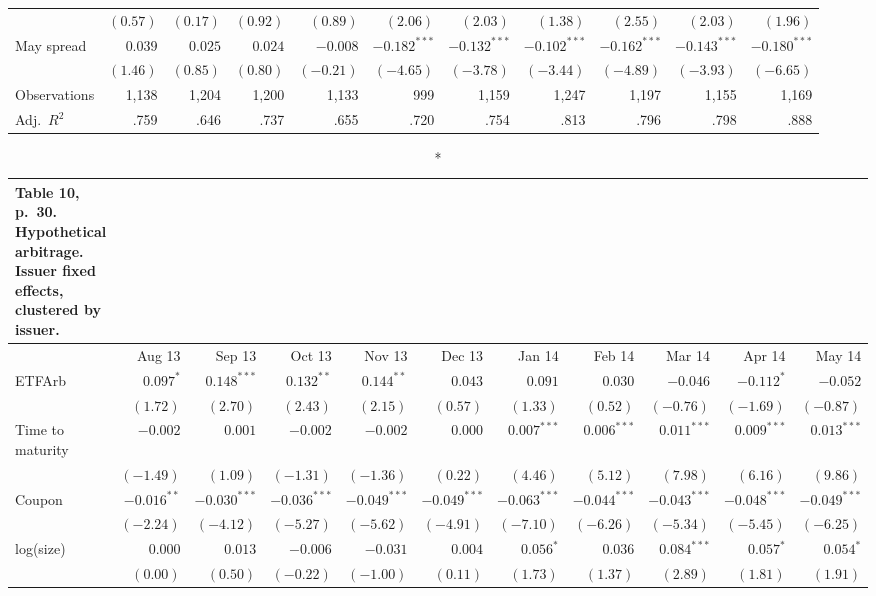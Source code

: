 \documentclass[10pt,a4paper]{article}
\begin{document}
{\begin{longtable}{@{}l*{10}{r}@{}}
 & $(0.57)$ & $(0.17)$ & $(0.92)$ & $(0.89)$ & $(2.06)$ & $(2.03)$ & $(1.38)$ & $(2.55)$ & $(2.03)$ & $(1.96)$\\
May spread & $0.039$ & $0.025$ & $0.024$ & $-0.008$ & $-0.182^{***}$ & $-0.132^{***}$ & $-0.102^{***}$ & $-0.162^{***}$ & $-0.143^{***}$ & $-0.180^{***}$\\
 & $(1.46)$ & $(0.85)$ & $(0.80)$ & $(-0.21)$ & $(-4.65)$ & $(-3.78)$ & $(-3.44)$ & $(-4.89)$ & $(-3.93)$ & $(-6.65)$\\
Observations & 1,138 & 1,204 & 1,200 & 1,133 & 999 & 1,159 & 1,247 & 1,197 & 1,155 & 1,169\\
Adj.\ $R^2$ & .759 & .646 & .737 & .655 & .720 & .754 & .813 & .796 & .798 & .888\\
\bottomrule
\end{longtable}}
{\scriptsize\setlength{\tabcolsep}{2pt}
\begin{longtable}{@{}l*{10}{r}@{}}
\caption*{\textbf{Table 10, p.~30. Hypothetical arbitrage. Issuer fixed effects, clustered by issuer.}}\\
\toprule
 & Aug 13 & Sep 13 & Oct 13 & Nov 13 & Dec 13 & Jan 14 & Feb 14 & Mar 14 & Apr 14 & May 14\\
\midrule\endhead
ETFArb & $0.097^{*}$ & $0.148^{***}$ & $0.132^{**}$ & $0.144^{**}$ & $0.043$ & $0.091$ & $0.030$ & $-0.046$ & $-0.112^{*}$ & $-0.052$\\
 & $(1.72)$ & $(2.70)$ & $(2.43)$ & $(2.15)$ & $(0.57)$ & $(1.33)$ & $(0.52)$ & $(-0.76)$ & $(-1.69)$ & $(-0.87)$\\
Time to maturity & $-0.002$ & $0.001$ & $-0.002$ & $-0.002$ & $0.000$ & $0.007^{***}$ & $0.006^{***}$ & $0.011^{***}$ & $0.009^{***}$ & $0.013^{***}$\\
 & $(-1.49)$ & $(1.09)$ & $(-1.31)$ & $(-1.36)$ & $(0.22)$ & $(4.46)$ & $(5.12)$ & $(7.98)$ & $(6.16)$ & $(9.86)$\\
Coupon & $-0.016^{**}$ & $-0.030^{***}$ & $-0.036^{***}$ & $-0.049^{***}$ & $-0.049^{***}$ & $-0.063^{***}$ & $-0.044^{***}$ & $-0.043^{***}$ & $-0.048^{***}$ & $-0.049^{***}$\\
 & $(-2.24)$ & $(-4.12)$ & $(-5.27)$ & $(-5.62)$ & $(-4.91)$ & $(-7.10)$ & $(-6.26)$ & $(-5.34)$ & $(-5.45)$ & $(-6.25)$\\
log(size) & $0.000$ & $0.013$ & $-0.006$ & $-0.031$ & $0.004$ & $0.056^{*}$ & $0.036$ & $0.084^{***}$ & $0.057^{*}$ & $0.054^{*}$\\
 & $(0.00)$ & $(0.50)$ & $(-0.22)$ & $(-1.00)$ & $(0.11)$ & $(1.73)$ & $(1.37)$ & $(2.89)$ & $(1.81)$ & $(1.91)$\\

\end{longtable}}
\end{document}
